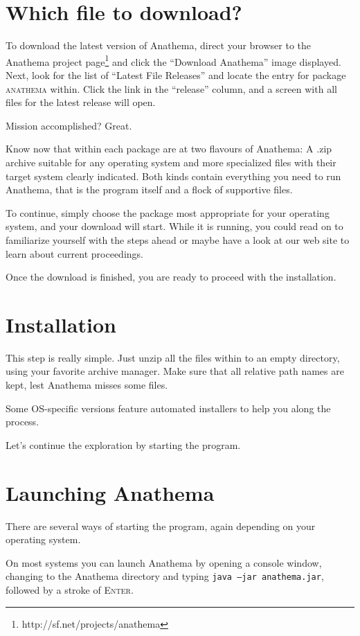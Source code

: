 \section{Which file to download?}
To download the latest version of Anathema, direct your browser to the Anathema project page\footnote{http://sf.net/projects/anathema} and click the ``Download Anathema'' image displayed. Next, look for the list of ``Latest File Releases'' and locate the entry for package \textsc{anathema} within. Click the link in the ``release'' column, and a screen with all files for the latest release will open.

Mission accomplished? Great.

Know now that within each package are at two flavours of Anathema: A .zip archive suitable for any operating system and more specialized files with their target system clearly indicated. Both kinds contain everything you need to run Anathema, that is the program itself and a flock of supportive files. 

To continue, simply choose the package most appropriate for your operating system, and your download will start. While it is running, you could read on to familiarize yourself with the steps ahead or maybe have a look at our web site to learn about current proceedings.
\medskip

Once the download is finished, you are ready to proceed with the installation.

\section{Installation}
This step is really simple. Just unzip all the files within to an empty directory, using your favorite archive manager. Make sure that all relative path names are kept, lest Anathema misses some files.

Some OS-specific versions feature automated installers to help you along the process.
\medskip

Let's continue the exploration by starting the program.

\section{Launching Anathema}
There are several ways of starting the program, again depending on your operating system.

On most systems you can launch Anathema by opening a console window, changing to the Anathema directory and typing \texttt{java --jar anathema.jar}, followed by a stroke of \textsc{Enter}.

